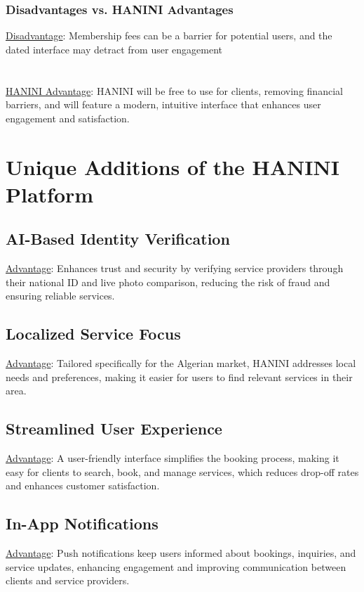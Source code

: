 \documentclass[12pt,a4paper]{report}
\begin{document}
\subsection*{Disadvantages vs. HANINI Advantages}
\underline {Disadvantage}: Membership fees can be a barrier for potential users, and the dated interface may detract from user engagement\\
\textbf{                      }\\
\textbf{                      }\\
\underline {HANINI Advantage}:  HANINI will be free to use for clients, removing financial barriers, and will feature a modern, intuitive interface that enhances user engagement and satisfaction.
\chapter{Unique Additions of the HANINI Platform}
\section{AI-Based Identity Verification}
\underline {Advantage}: Enhances trust and security by verifying service providers through their national ID and live photo comparison, reducing the risk of fraud and ensuring reliable services.

\section{Localized Service Focus}
\underline {Advantage}: Tailored specifically for the Algerian market, HANINI addresses local needs and preferences, making it easier for users to find relevant services in their area.

\section{Streamlined User Experience}
\underline {Advantage}:  A user-friendly interface simplifies the booking process, making it easy for clients to search, book, and manage services, which reduces drop-off rates and enhances customer satisfaction.

\section{In-App Notifications}
\underline {Advantage}:  Push notifications keep users informed about bookings, inquiries, and service updates, enhancing engagement and improving communication between clients and service providers.
\end{document}
